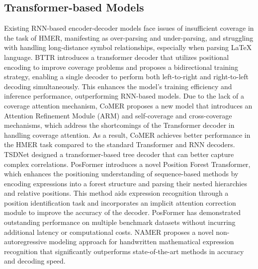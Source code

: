\subsection{Transformer-based Models}
Existing RNN-based encoder-decoder models face issues of insufficient coverage in the task of HMER, manifesting as over-parsing and under-parsing, and struggling with handling long-distance symbol relationships, especially when parsing LaTeX language. BTTR \cite{b16} introduces a transformer decoder that utilizes positional encoding to improve coverage problems and proposes a bidirectional training strategy, enabling a single decoder to perform both left-to-right and right-to-left decoding simultaneously. This enhances the model’s training efficiency and inference performance, outperforming RNN-based models. Due to the lack of a coverage attention mechanism, CoMER\cite{b17} proposes a new model that introduces an Attention Refinement Module (ARM) and self-coverage and cross-coverage mechanisms, which address the shortcomings of the Transformer decoder in handling coverage attention. As a result, CoMER achieves better performance in the HMER task compared to the standard Transformer and RNN decoders. TSDNet \cite{b28} designed a transformer-based tree decoder that can better capture complex correlations. PosFormer \cite{b18} introduces a novel Position Forest Transformer, which enhances the positioning understanding of sequence-based methods by encoding expressions into a forest structure and parsing their nested hierarchies and relative positions. This method aids expression recognition through a position identification task and incorporates an implicit attention correction module to improve the accuracy of the decoder. PosFormer has demonstrated outstanding performance on multiple benchmark datasets without incurring additional latency or computational costs. NAMER \cite{b29} proposes a novel non-autoregressive modeling approach for handwritten mathematical expression recognition that significantly outperforms state-of-the-art methods in accuracy and decoding speed.